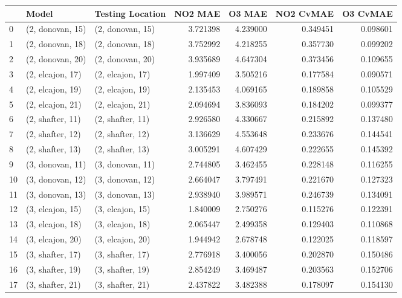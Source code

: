 \begin{tabular}{lllrrrr}
\toprule
{} &             Model &  Testing Location &   NO2 MAE &    O3 MAE &  NO2 CvMAE &  O3 CvMAE \\
\midrule
0  &  (2, donovan, 15) &  (2, donovan, 15) &  3.721398 &  4.239000 &   0.349451 &  0.098601 \\
1  &  (2, donovan, 18) &  (2, donovan, 18) &  3.752992 &  4.218255 &   0.357730 &  0.099202 \\
2  &  (2, donovan, 20) &  (2, donovan, 20) &  3.935689 &  4.647304 &   0.373456 &  0.109655 \\
3  &  (2, elcajon, 17) &  (2, elcajon, 17) &  1.997409 &  3.505216 &   0.177584 &  0.090571 \\
4  &  (2, elcajon, 19) &  (2, elcajon, 19) &  2.135453 &  4.069165 &   0.189858 &  0.105529 \\
5  &  (2, elcajon, 21) &  (2, elcajon, 21) &  2.094694 &  3.836093 &   0.184202 &  0.099377 \\
6  &  (2, shafter, 11) &  (2, shafter, 11) &  2.926580 &  4.330667 &   0.215892 &  0.137480 \\
7  &  (2, shafter, 12) &  (2, shafter, 12) &  3.136629 &  4.553648 &   0.233676 &  0.144541 \\
8  &  (2, shafter, 13) &  (2, shafter, 13) &  3.005291 &  4.607429 &   0.222655 &  0.145392 \\
9  &  (3, donovan, 11) &  (3, donovan, 11) &  2.744805 &  3.462455 &   0.228148 &  0.116255 \\
10 &  (3, donovan, 12) &  (3, donovan, 12) &  2.664047 &  3.797491 &   0.221670 &  0.127323 \\
11 &  (3, donovan, 13) &  (3, donovan, 13) &  2.938940 &  3.989571 &   0.246739 &  0.134091 \\
12 &  (3, elcajon, 15) &  (3, elcajon, 15) &  1.840009 &  2.750276 &   0.115276 &  0.122391 \\
13 &  (3, elcajon, 18) &  (3, elcajon, 18) &  2.065447 &  2.499358 &   0.129403 &  0.110868 \\
14 &  (3, elcajon, 20) &  (3, elcajon, 20) &  1.944942 &  2.678748 &   0.122025 &  0.118597 \\
15 &  (3, shafter, 17) &  (3, shafter, 17) &  2.776918 &  3.400056 &   0.202870 &  0.150486 \\
16 &  (3, shafter, 19) &  (3, shafter, 19) &  2.854249 &  3.469487 &   0.203563 &  0.152706 \\
17 &  (3, shafter, 21) &  (3, shafter, 21) &  2.437822 &  3.482388 &   0.178097 &  0.154130 \\

\end{tabular}

